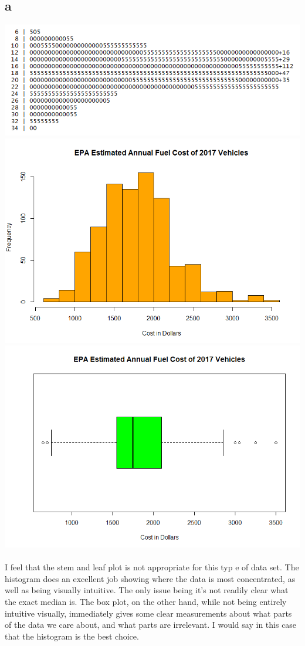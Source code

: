 \documentclass[10pt,letterpaper]{article}
\begin{document}
\subsection*{a}
\includegraphics[scale=.5]{stem}\\
\includegraphics[scale=.5]{hist}\\
\includegraphics[scale=.5]{box}\\\\
I feel that the stem and leaf plot is not appropriate for this typ e of data 
set. The histogram does an excellent job showing where the data is most 
concentrated, as well as being visually intuitive. The only issue being it's
not readily clear what the exact median is. The box plot, on the other hand,
while not being entirely intuitive visually, immediately gives some clear
measurements about what parts of the data we care about, and what parts are
irrelevant. I would say in this case that the histogram is the best choice.
\end{document}
